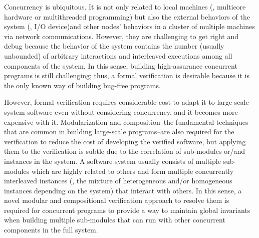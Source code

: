 Concurrency is ubiquitous. It is not only related to local machines 
 (\ie, multicore hardware or multithreaded programming)
but also the external behaviors of the system  (\ie, I/O device)and other nodes’ behaviors in a cluster of multiple machines via network communications.
However, they are challenging to get right and debug because the behavior of the system contains the number
(usually unbounded) of arbitrary interactions and interleaved executions among all components of the system. 
In this sense, building high-assurance concurrent programs is still challenging; thus, a formal verification is desirable 
because it is the only known way of building bug-free programs.

However, formal verification requires considerable cost to adapt it to large-scale system software even without considering concurrency, 
and it becomes more expensive with it. 
Modularization and composition--the fundamental techniques that are common in building large-scale programs--are also required for the verification
to reduce the cost of developing the verified software, but applying them to the verification is subtle due to the correlation of sub-modules 
or/and instances in the system. 
A software system usually consists of multiple sub-modules which are highly related to others and form multiple concurrently interleaved instances 
(\ie, the mixture of heterogeneous and/or homogeneous instances depending on the system) that interact with others. In this sense, a novel modular 
and compositional verification approach to resolve them is required for concurrent programs to provide a way to maintain global invariants 
when building multiple sub-modules that can run with other concurrent components in the full system.


